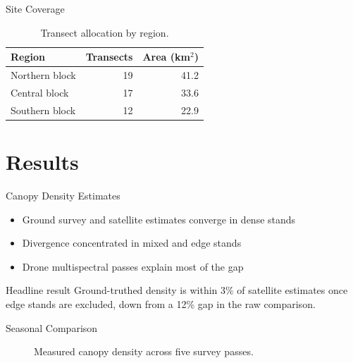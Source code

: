 \documentclass{beamer}
\begin{document}
\begin{frame}{Site Coverage}
  \begin{table}
    \centering
    \begin{tabular}{lrr}
      \toprule
      Region & Transects & Area (km$^2$) \\
      \midrule
      Northern block & 19 & 41.2 \\
      Central block & 17 & 33.6 \\
      Southern block & 12 & 22.9 \\
      \bottomrule
    \end{tabular}
    \caption{Transect allocation by region.}
  \end{table}
\end{frame}

\section{Results}

\begin{frame}{Canopy Density Estimates}
  \begin{itemize}
    \item Ground survey and satellite estimates converge in dense stands
    \item Divergence concentrated in mixed and edge stands
    \item Drone multispectral passes explain most of the gap
  \end{itemize}
  \vfill
  \begin{block}{Headline result}
    Ground-truthed density is within 3\% of satellite estimates once edge
    stands are excluded, down from a 12\% gap in the raw comparison.
  \end{block}
\end{frame}

\begin{frame}{Seasonal Comparison}
  \begin{figure}
    \centering
    \caption{Measured canopy density across five survey passes.}
  \end{figure}
\end{frame}
\end{document}
